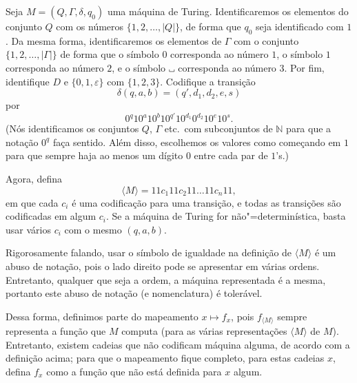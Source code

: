 \begin{definition}
    Seja $M = (Q, \Gamma, \delta, q_0)$ uma máquina de Turing.
    Identificaremos os elementos do conjunto $Q$
    com os números $\{1, 2, \dots, |Q|\}$,
    de forma que $q_0$ seja identificado com $1$.
    Da mesma forma,
    identificaremos os elementos de $\Gamma$
    com o conjunto $\{1, 2, \dots, |\Gamma|\}$
    de forma que o símbolo $0$ corresponda ao número $1$,
    o símbolo $1$ corresponda ao número $2$,
    e o símbolo $\B$ corresponda ao número $3$.
    Por fim, identifique $D$ e $\{0, 1, \varepsilon\}$ com $\{1, 2, 3\}$.
    Codifique a transição
    \begin{equation*}
        \delta(q, a, b) = (q', d_1, d_2, e, s)
    \end{equation*}
    por
    \begin{equation*}
        0^q 1 0^a 1 0^b 1 0^{q'} 1 0^{d_1} 0^{d_2} 1 0^e 1 0^s.
    \end{equation*}
    (Nós identificamos os conjuntos $Q$, $\Gamma$ etc.\ com subconjuntos de $\mathbb N$
    para que a notação $0^q$ faça sentido.
    Além disso,
    escolhemos os valores como começando em $1$
    para que sempre haja ao menos um dígito $0$ entre cada par de $1$'s.)

    Agora,
    defina
    \begin{equation*}
        \langle M \rangle = 11 c_1 11 c_2 11 \dots 11 c_n 11,
    \end{equation*}
    em que cada $c_i$ é uma codificação para uma transição,
    e todas as transições são codificadas em algum $c_i$.
    Se a máquina de Turing for não"=determinística,
    basta usar vários $c_i$ com o mesmo $(q, a, b)$.
\end{definition}

Rigorosamente falando,
usar o símbolo de igualdade na definição de $\langle M \rangle$
é um abuso de notação,
pois o lado direito pode se apresentar em várias ordens.
Entretanto,
qualquer que seja a ordem,
a máquina representada é a mesma,
portanto este abuso de notação (e nomenclatura) é tolerável.

Dessa forma,
definimos parte do mapeamento $x \mapsto f_x$,
pois $f_{\langle M \rangle}$ sempre representa a função que $M$ computa
(para as várias representações $\langle M \rangle$ de $M$).
Entretanto,
existem cadeias que não codificam máquina alguma,
de acordo com a definição acima;
para que o mapeamento fique completo,
para estas cadeias $x$,
defina $f_x$ como a função que não está definida para $x$ algum.
